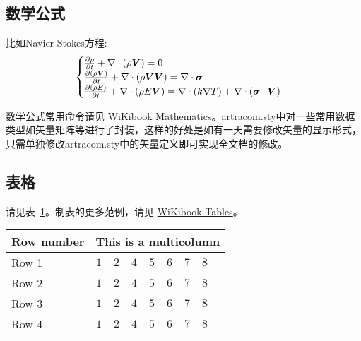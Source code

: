 \subsection{数学公式}

比如Navier-Stokes方程:
\begin{equation} \label{eq:ns}
    \begin{cases}
        \frac{\partial \rho}{\partial t} + \nabla\cdot(\rho\boldsymbol{V}) = 0 \\
        \frac{\partial (\rho\boldsymbol{V})}{\partial t} + \nabla\cdot(\rho\boldsymbol{V}\boldsymbol{V}) = \nabla\cdot\boldsymbol{\mathsf{\sigma}}\\
        \frac{\partial (\rho E)}{\partial t} + \nabla\cdot(\rho E\boldsymbol{V}) = \nabla\cdot(k\nabla T) + \nabla\cdot(\boldsymbol{\mathsf{\sigma}}\cdot\boldsymbol{V})
    \end{cases}
\end{equation}

数学公式常用命令请见 \href{https://en.wikibooks.org/wiki/LaTeX/Mathematics}{WiKibook Mathematics}。artracom.sty中对一些常用数据类型如矢量矩阵等进行了封装，这样的好处是如有一天需要修改矢量的显示形式，只需单独修改artracom.sty中的矢量定义即可实现全文档的修改。

\subsection{表格}

请见表~\ref{tab:sample}。制表的更多范例，请见 \href{https://en.wikibooks.org/wiki/LaTeX/Tables}{WiKibook Tables}。
\begin{table}[!htbp]
    \centering
    \footnotesize%
    \setlength{\tabcolsep}{4pt}%
    \renewcommand{\arraystretch}{1.2}%
    \begin{tabular}{lcccccccc}
        \hline
        Row number & \multicolumn{8}{c}{This is a multicolumn} \\
        \hline
        Row 1 & $1$ & $2$ & $4$ & $5$ & $6$ & $7$ & $8$\\
        Row 2 & $1$ & $2$ & $4$ & $5$ & $6$ & $7$ & $8$\\
        Row 3 & $1$ & $2$ & $4$ & $5$ & $6$ & $7$ & $8$\\
        Row 4 & $1$ & $2$ & $4$ & $5$ & $6$ & $7$ & $8$\\
        \hline
    \end{tabular}
    \label{tab:sample}
\end{table}

